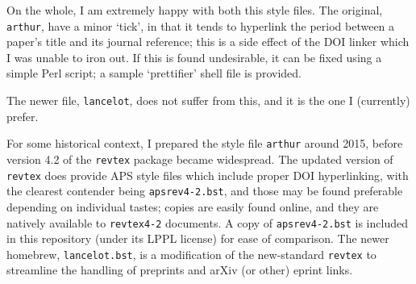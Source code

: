 \documentclass[%
  reprint,
  aps,
  pra,
  superscriptaddress,
  a4paper
]{revtex4-2}
\begin{document}
On the whole, I am extremely happy with both this style files.
The original, \texttt{arthur}, have a minor `tick', in that it tends to hyperlink the period between a paper's title and its journal reference; this is a side effect of the DOI linker which I was unable to iron out. 
If this is found undesirable, it can be fixed using a simple Perl script; a sample `prettifier' shell file is provided.

The newer file, \texttt{lancelot}, does not suffer from this, and it is the one I (currently) prefer.

For some historical context, I prepared the style file \texttt{arthur} around 2015, before version 4.2 of the \texttt{revtex} package became widespread. 
The updated version of \texttt{revtex} does provide APS style files which include proper DOI hyperlinking, with the clearest contender being \texttt{apsrev4-2.bst}, and those may be found preferable depending on individual tastes; copies are easily found online, and they are natively available to \texttt{revtex4-2} documents. 
A copy of \texttt{apsrev4-2.bst} is included in this repository (under its LPPL license) for ease of comparison.
The newer homebrew, \texttt{lancelot.bst}, is a modification of the new-standard \texttt{revtex} to streamline the handling of preprints and arXiv (or other) eprint links.


%
%

{}
\end{document}

